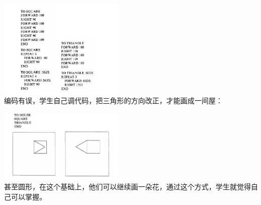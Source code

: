 
\includegraphics[width=6cm]{微信截图_20230323093342.png}\\
编码有误，学生自己调代码，把三角形的方向改正，才能画成一间屋：



\includegraphics[width=6cm]{微信截图_20230323093355.png}\\
甚至圆形，在这个基础上，他们可以继续画一朵花，通过这个方式，学生就觉得自己可以掌握。


